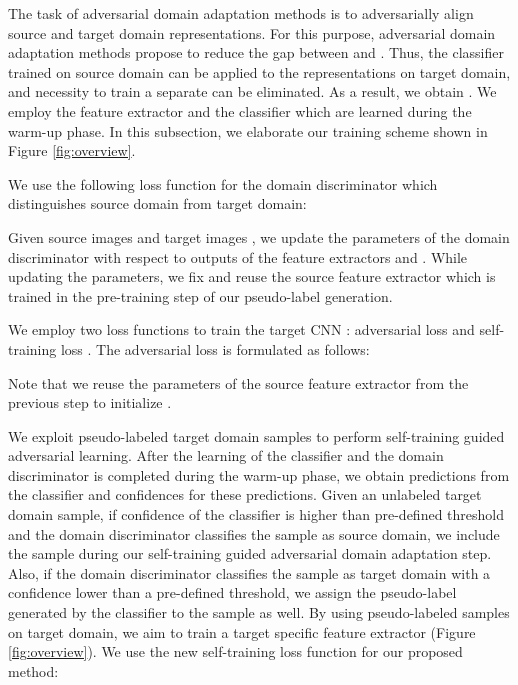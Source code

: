 \documentclass[final]{cvpr}
\begin{document}
The task of adversarial domain adaptation methods is to adversarially align source and target domain representations. For this purpose, adversarial domain adaptation methods propose to reduce the gap between  and . Thus, the classifier  trained on source domain can be applied to the representations on target domain, and necessity to train a separate  can be eliminated. As a result, we obtain  \cite{adda}. We employ the feature extractor  and the classifier  which are learned during the warm-up phase. In this subsection, we elaborate our training scheme shown in Figure \ref{fig:overview}.

We use the following loss function for the domain discriminator  which distinguishes source domain from target domain:



Given source images  and target images , we update the parameters of the domain discriminator  with respect to outputs of the feature extractors  and . While updating the parameters, we fix and reuse the source feature extractor  which is trained in the pre-training step of our pseudo-label generation.\vspace{2mm}

We employ two loss functions to train the target CNN : adversarial loss  and self-training loss . The adversarial loss is formulated as follows: 



Note that we reuse the parameters of the source feature extractor  from the previous step to initialize .
\vspace{2mm}

We exploit pseudo-labeled target domain samples to perform self-training guided adversarial learning. After the learning of the classifier  and the domain discriminator  is completed during the warm-up phase, we obtain predictions from the classifier and confidences for these predictions. Given an unlabeled target domain sample, if confidence of the classifier  is higher than pre-defined threshold and the domain discriminator  classifies the sample as source domain, we include the sample during our self-training guided adversarial domain adaptation step. Also, if the domain discriminator  classifies the sample as target domain with a confidence lower than a pre-defined threshold, we assign the pseudo-label  generated by the classifier  to the sample as well. By using  pseudo-labeled samples on target domain, we aim to train a target specific feature extractor (Figure \ref{fig:overview}). We use the new self-training loss function for our proposed method:
\end{document}
